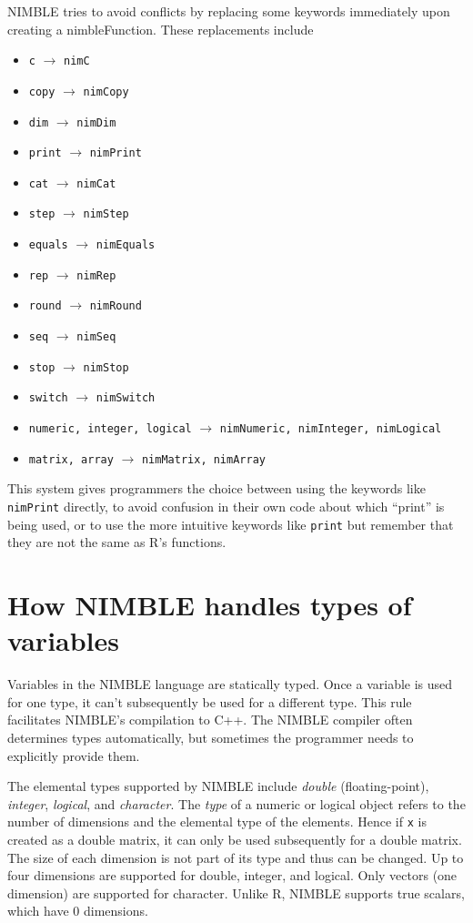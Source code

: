 \documentclass[12pt,oneside]{book}\usepackage[]{graphicx}\usepackage[]{color}
\def\cd#1{\texttt{#1}}
\def\nm#1{\textit{#1}}
\begin{document}
NIMBLE tries to avoid conflicts by replacing
some keywords immediately upon creating a nimbleFunction.  These
replacements include
\begin{multicols}{2}
\begin{itemize}
\item \cd{c} $\rightarrow$ \cd{nimC}
\item \cd{copy} $\rightarrow$ \cd{nimCopy}
\item \cd{dim}  $\rightarrow$ \cd{nimDim}
\item \cd{print} $\rightarrow$ \cd{nimPrint}
\item \cd{cat} $\rightarrow$ \cd{nimCat}
\item \cd{step} $\rightarrow$ \cd{nimStep}
\item \cd{equals} $\rightarrow$ \cd{nimEquals}
\item \cd{rep} $\rightarrow$ \cd{nimRep}
\item \cd{round} $\rightarrow$ \cd{nimRound}
\item \cd{seq} $\rightarrow$ \cd{nimSeq}
\item \cd{stop} $\rightarrow$ \cd{nimStop}
\item \cd{switch} $\rightarrow$ \cd{nimSwitch}
\item \cd{numeric, integer, logical} $\rightarrow$ \cd{nimNumeric, nimInteger, nimLogical}
\item \cd{matrix, array} $\rightarrow$ \cd{nimMatrix, nimArray}
\end{itemize}
\end{multicols}

This system gives programmers the choice between using the keywords like
\cd{nimPrint} directly, to avoid confusion in their own code about
which ``print'' is being used, or to use the more intuitive keywords
like \cd{print} but remember that they are not the same as R's functions.

\section{How NIMBLE handles types of variables}
\label{sec:how-nimble-handles}

Variables in the NIMBLE language are statically typed. Once a variable
is used for one type, it can't subsequently be used for a different
type.  This rule facilitates NIMBLE's compilation to C++.  The NIMBLE
compiler often determines types automatically, but sometimes the
programmer needs to explicitly provide them.

The elemental types supported by NIMBLE include \nm{double}
(floating-point), \nm{integer}, \nm{logical}, and \nm{character}.   The \nm{type} of
a numeric or logical object refers to the number
of dimensions and the elemental type of the elements.  Hence if \cd{x}
is created as a double matrix, it can only be used subsequently for a double
matrix.  The size of each dimension is not part of its type and thus
can be changed.  Up to four
dimensions are supported for double, integer, and logical.  Only
vectors (one dimension) are supported for character.  Unlike R, NIMBLE supports true
scalars, which have 0 dimensions.
\end{document}
